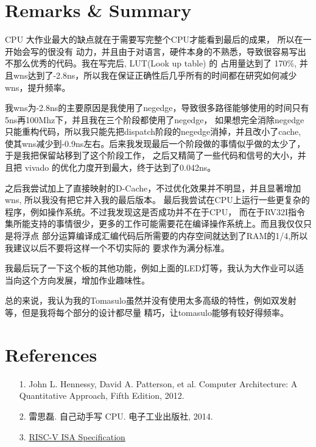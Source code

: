 \documentclass[UTF8]{ctexart}
\begin{document}
\section{Remarks \& Summary}
    CPU 大作业最大的缺点就在于需要写完整个CPU才能看到最后的成果， 所以在一开始会写的很没有
    动力，并且由于对语言，硬件本身的不熟悉，导致很容易写出不那么优秀的代码。我在写完后, LUT(Look up table) 的
    占用量达到了 170\%, 并且wns达到了-2.8ns，所以我在保证正确性后几乎所有的时间都在研究如何减少wns，提升频率。

    我wns为-2.8ns的主要原因是我使用了negedge，导致很多路径能够使用的时间只有5ns再100Mhz下，并且我在三个阶段都使用了negedge，
    如果想完全消除negedge只能重构代码，所以我只能先把dispatch阶段的negedge消掉，并且改小了cache,
    使其wns减少到-0.9ns左右。后来我发现最后一个阶段做的事情似乎做的太少了，于是我把保留站移到了这个阶段工作，
    之后又精简了一些代码和信号的大小，并且把 vivado 的优化力度开到最大，终于达到了0.042ns。

    之后我尝试加上了直接映射的D-Cache，不过优化效果并不明显，并且显著增加wns, 所以我没有把它并入我的最后版本。
    最后我尝试在CPU上运行一些更复杂的程序，例如操作系统。不过我发现这是否成功并不在于CPU，
    而在于RV32I指令集所能支持的事情很少，更多的工作可能需要花在编译操作系统上。而且我仅仅只是将浮点
    部分运算编译成汇编代码后所需要的内存空间就达到了RAM的1/4,所以我建议以后不要将这样一个不切实际的
    要求作为满分标准。

    我最后玩了一下这个板的其他功能，例如上面的LED灯等，我认为大作业可以适当向这个方向发展，增加作业趣味性。

    总的来说，我认为我的Tomasulo虽然并没有使用太多高级的特性，例如双发射等，但是我将每个部分的设计都尽量
    精巧，让tomasulo能够有较好得频率。

\section{References}
    \begin{itemize}
        \item [1.] 
        John L. Hennessy, David A. Patterson, et al. Computer Architecture: A Quantitative Approach, Fifth Edition, 2012.
        \item [2.]
        雷思磊. 自己动手写 CPU. 电子工业出版社, 2014.
        \item [3.]
        \href{http://riscv.org/specifications/}{RISC-V ISA Specification}
    \end{itemize}

\newpage
\end{document}

